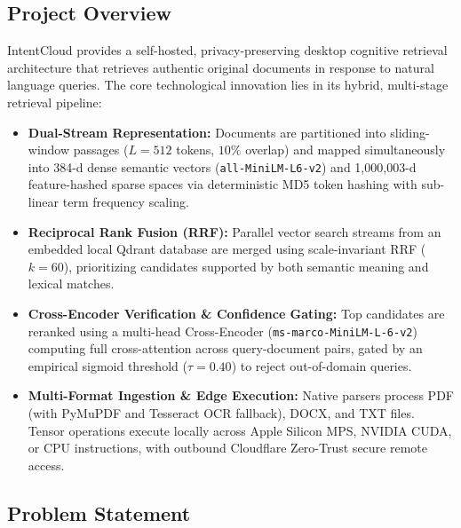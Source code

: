 \documentclass[a4paper,12pt]{article}
\begin{document}
\subsection{Project Overview}
\label{sec:project_overview}

IntentCloud provides a self-hosted, privacy-preserving desktop cognitive retrieval architecture that retrieves authentic original documents in response to natural language queries. The core technological innovation lies in its hybrid, multi-stage retrieval pipeline:
\begin{itemize}
    \setlength{\itemsep}{0pt}
    \setlength{\parskip}{0pt}
    \item \textbf{Dual-Stream Representation:} Documents are partitioned into sliding-window passages ($L = 512$ tokens, $10\%$ overlap) and mapped simultaneously into 384-d dense semantic vectors (\texttt{all-MiniLM-L6-v2}) and 1,000,003-d feature-hashed sparse spaces via deterministic MD5 token hashing with sub-linear term frequency scaling.
    \item \textbf{Reciprocal Rank Fusion (RRF):} Parallel vector search streams from an embedded local Qdrant database are merged using scale-invariant RRF ($k=60$), prioritizing candidates supported by both semantic meaning and lexical matches.
    \item \textbf{Cross-Encoder Verification \& Confidence Gating:} Top candidates are reranked using a multi-head Cross-Encoder (\texttt{ms-marco-MiniLM-L-6-v2}) computing full cross-attention across query-document pairs, gated by an empirical sigmoid threshold ($\tau = 0.40$) to reject out-of-domain queries.
    \item \textbf{Multi-Format Ingestion \& Edge Execution:} Native parsers process PDF (with PyMuPDF and Tesseract OCR fallback), DOCX, and TXT files. Tensor operations execute locally across Apple Silicon MPS, NVIDIA CUDA, or CPU instructions, with outbound Cloudflare Zero-Trust secure remote access.
\end{itemize}

\subsection{Problem Statement}
\label{sec:problem_statement}
\end{document}
